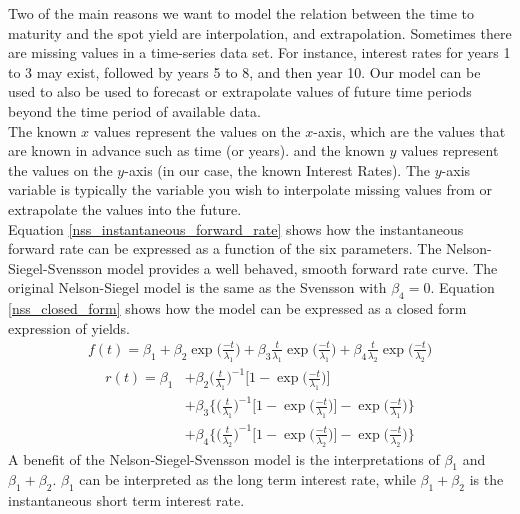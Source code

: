 \documentclass[11pt]{article}
\begin{document}
Two of the main reasons we want to model the relation between the time to maturity and the spot yield are interpolation, and extrapolation.
Sometimes there are missing values in a time-series data set. For instance, interest rates for years 1 to 3 may exist, followed by years 5 to 8, and then year 10. Our model can be used to also be used to forecast or extrapolate values of future time periods beyond the time period of available data.\\

The known $x$ values represent the values on the $x$-axis, which are the values that are known in advance such as time (or years). and the known $y$ values represent the values on the $y$-axis (in our case, the known Interest Rates). The $y$-axis variable is typically the variable you wish to interpolate missing values from or extrapolate the values into the future.\\

 Equation \eqref{nss_instantaneous_forward_rate} shows how the instantaneous forward rate can be expressed as a function of the six parameters. The Nelson-Siegel-Svensson model provides a well behaved, smooth forward rate curve. The original Nelson-Siegel model is the same as the Svensson with $\beta_4=0$. Equation \eqref{nss_closed_form} shows how the model can be expressed as a closed form expression of yields.
\begin{align}
	f(t)=\beta_1+\beta_2\exp\bigg(\frac{-t}{\lambda_1}\bigg)
			+\beta_3\frac{t}{\lambda_1}\exp\bigg(\frac{-t}{\lambda_1}\bigg)
			+\beta_4\frac{t}{\lambda_2}\exp\bigg(\frac{-t}{\lambda_2}\bigg)
			\label{nss_instantaneous_forward_rate}
\end{align}
\begin{align}
	r(t)=\beta_1&+\beta_2\bigg(\frac{t}{\lambda_1}\bigg)^{-1}\bigg[1-\exp\bigg(\frac{-t}{\lambda_1}\bigg)\bigg]\nonumber\\
		&+\beta_3\bigg\{\bigg(\frac{t}{\lambda_1}\bigg)^{-1}\bigg[1-\exp\bigg(\frac{-t}{\lambda_1}\bigg)\bigg]-\exp\bigg(\frac{-t}{\lambda_1}\bigg)\bigg\}\nonumber\\
		&+\beta_4\bigg\{\bigg(\frac{t}{\lambda_2}\bigg)^{-1}\bigg[1-\exp\bigg(\frac{-t}{\lambda_2}\bigg)\bigg]-\exp\bigg(\frac{-t}{\lambda_2}\bigg)\bigg\}
		\label{nss_closed_form}
\end{align}
A benefit of the Nelson-Siegel-Svensson model is the interpretations of $\beta_1$ and $\beta_1+\beta_2$. $\beta_1$ can be interpreted as the long term interest rate, while $\beta_1+\beta_2$ is the instantaneous short term interest rate.
\end{document}
